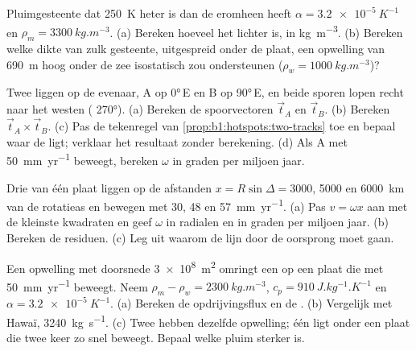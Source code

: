 \begin{exercise}[$\star$]\label{exo:b1:hotspots:4}
Pluimgesteente dat \qty{250}{K} heter is dan de  eromheen heeft $\alpha = \qty{3.2e-5}{K^{-1}}$ en $\rho_m = \qty{3300}{kg.m^{-3}}$. (a) Bereken hoeveel het lichter is, in \unit{kg.m^{-3}}. (b) Bereken welke dikte van zulk gesteente, uitgespreid onder de plaat, een opwelling van \qty{690}{m} hoog onder de zee isostatisch zou ondersteunen ($\rho_w = \qty{1000}{kg.m^{-3}}$)?
\end{exercise}

\begin{exercise}[$\star\star$]\label{exo:b1:hotspots:5}
Twee  liggen op de evenaar, A op \ang{0}\,E en B op \ang{90}\,E, en beide sporen lopen recht naar het westen ( \ang{270}). (a) Bereken de spoorvectoren $\vec t_A$ en $\vec t_B$. (b) Bereken $\vec t_A\times\vec t_B$. (c) Pas de tekenregel van \cref{prop:b1:hotspots:two-tracks} toe en bepaal waar de  ligt; verklaar het resultaat zonder berekening. (d) Als A met \qty{50}{mm.yr^{-1}} beweegt, bereken $\omega$ in graden per miljoen jaar.
\end{exercise}

\begin{exercise}[$\star\star$]\label{exo:b1:hotspots:6}
Drie  van één plaat liggen op de afstanden $x = R\sin\Delta = 3000$, 5000
en \qty{6000}{km} van de rotatieas en bewegen met 30, 48 en
\qty{57}{mm.yr^{-1}}. (a) Pas $v = \omega x$ aan met de kleinste kwadraten en geef
$\omega$ in radialen en in graden per miljoen jaar. (b) Bereken de
residuen. (c) Leg uit waarom de lijn door de oorsprong moet gaan.
\end{exercise}

\begin{exercise}[$\star\star$]\label{exo:b1:hotspots:7}
Een opwelling met doorsnede \qty{3e8}{m^2} omringt een  op een plaat die met
\qty{50}{mm.yr^{-1}} beweegt. Neem $\rho_m - \rho_w = \qty{2300}{kg.m^{-3}}$,
$c_p = \qty{910}{J.kg^{-1}.K^{-1}}$ en $\alpha = \qty{3.2e-5}{K^{-1}}$. (a)
Bereken de opdrijvingsflux en de . (b) Vergelijk met Hawaï,
\qty{3240}{kg.s^{-1}}. (c) Twee  hebben dezelfde opwelling; één ligt onder een plaat die twee keer zo snel beweegt. Bepaal welke pluim sterker is.
\end{exercise}

